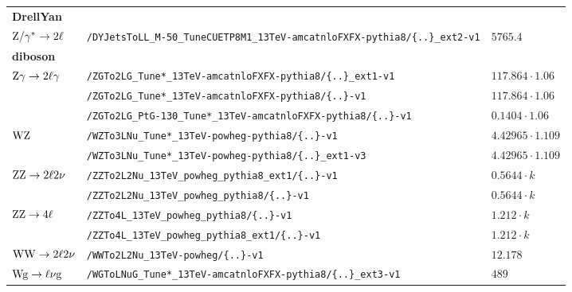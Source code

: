 \begin{table}[tb]
\begin{tabular}[width=\textwidth]{lll}
  \scriptsize{\textbf{DrellYan}}                   &                         &                                           \\
  $\mathrm{Z}/\gamma^{*}\to2\ell$                           & \verb|/DYJetsToLL_M-50_TuneCUETP8M1_13TeV-amcatnloFXFX-pythia8/{..}_ext2-v1| & $5765.4$                                  \\
  \scriptsize{\textbf{diboson}}                    &                         &                                           \\
  $\mathrm{Z}\gamma\to2\ell\gamma$                            & \verb|/ZGTo2LG_Tune*_13TeV-amcatnloFXFX-pythia8/{..}_ext1-v1| & $117.864\cdot1.06$                        \\
                                                   & \verb|/ZGTo2LG_Tune*_13TeV-amcatnloFXFX-pythia8/{..}-v1| & $117.864\cdot1.06$                        \\
                                                   & \verb|/ZGTo2LG_PtG-130_Tune*_13TeV-amcatnloFXFX-pythia8/{..}-v1| & $0.1404\cdot1.06$                         \\
  $\mathrm{W}\mathrm{Z}$                                         & \verb|/WZTo3LNu_Tune*_13TeV-powheg-pythia8/{..}-v1| & $4.42965\cdot1.109$                       \\
                                                   & \verb|/WZTo3LNu_Tune*_13TeV-powheg-pythia8/{..}_ext1-v3| & $4.42965\cdot1.109$                       \\
  $\mathrm{Z}\mathrm{Z}\to2\ell2\nu$                            & \verb|/ZZTo2L2Nu_13TeV_powheg_pythia8_ext1/{..}-v1| & $0.5644\cdot k$                           \\
                                                   & \verb|/ZZTo2L2Nu_13TeV_powheg_pythia8/{..}-v1| & $0.5644\cdot k$                           \\
  $\mathrm{Z}\mathrm{Z}\to4\ell$                                 & \verb|/ZZTo4L_13TeV_powheg_pythia8/{..}-v1| & $1.212\cdot k$                            \\
                                                   & \verb|/ZZTo4L_13TeV_powheg_pythia8_ext1/{..}-v1| & $1.212\cdot k$                            \\
  $\mathrm{W}\mathrm{W}\to2\ell2\nu$                            & \verb|/WWTo2L2Nu_13TeV-powheg/{..}-v1| & $12.178$                                  \\
  $\mathrm{W}\mathrm{g}\to\ell\nu\mathrm{g}$                           & \verb|/WGToLNuG_Tune*_13TeV-amcatnloFXFX-pythia8/{..}_ext3-v1| & $489$                                     \\

\end{tabular}
\end{table}
